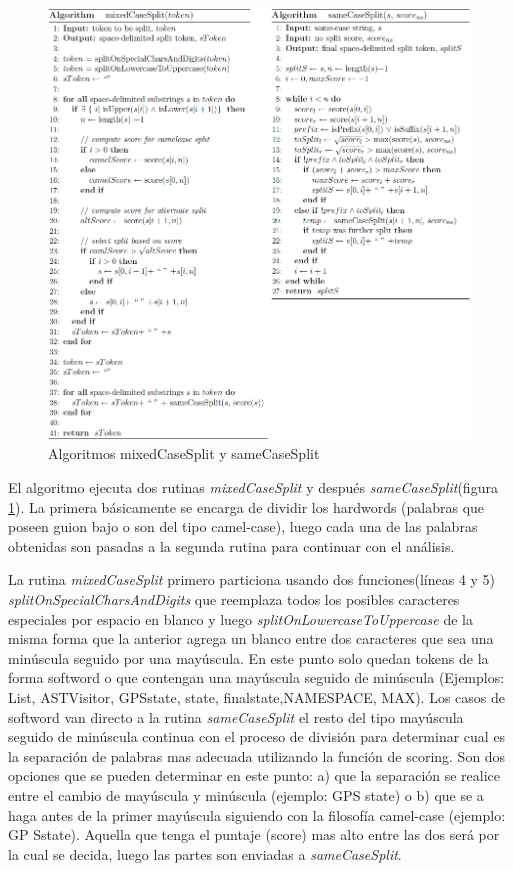 \documentclass[12pt]{report}
\begin{document}
\begin{figure}[h] %
\centering
\includegraphics[scale=0.5]{./sam_1.png}
\caption{Algoritmos mixedCaseSplit y sameCaseSplit}
\label{sam1}
\end{figure}

El algoritmo ejecuta dos rutinas \textit{mixedCaseSplit} y después \textit{sameCaseSplit}(figura \ref{sam1}). La primera básicamente se encarga de dividir los hardwords (palabras que poseen guion bajo o son del tipo camel-case), luego cada una de las palabras obtenidas son pasadas a la segunda rutina para continuar con el análisis\cite{EHPV09}.

La rutina \textit{mixedCaseSplit} primero particiona usando dos funciones(líneas 4 y 5) \textit{splitOnSpecialCharsAndDigits} que reemplaza todos los posibles caracteres especiales por espacio en blanco y luego \textit{splitOnLowercaseToUppercase} de la misma forma que la anterior agrega un blanco entre dos caracteres que sea una minúscula seguido por una mayúscula. En este punto solo quedan tokens de la forma softword o que contengan una mayúscula seguido de minúscula (Ejemplos: \textsf{List, ASTVisitor, GPSstate, state, finalstate,\linebreak  NAMESPACE, MAX}). Los casos de softword van directo a la rutina \textit{sameCaseSplit} el resto del tipo mayúscula seguido de minúscula continua con el proceso de división para determinar cual es la separación de palabras mas adecuada utilizando la función de scoring. Son dos opciones que se pueden determinar en este punto: a) que la separación se realice entre el cambio de mayúscula y minúscula (ejemplo: \textsf{GPS state}) o b) que se a haga antes de la primer mayúscula siguiendo con la filosofía camel-case (ejemplo: \textsf{GP Sstate}). Aquella que tenga el puntaje (score) mas alto entre las dos será por la cual se decida, luego las partes son enviadas a \textit{sameCaseSplit}\cite{EHPV09}.
\end{document}
